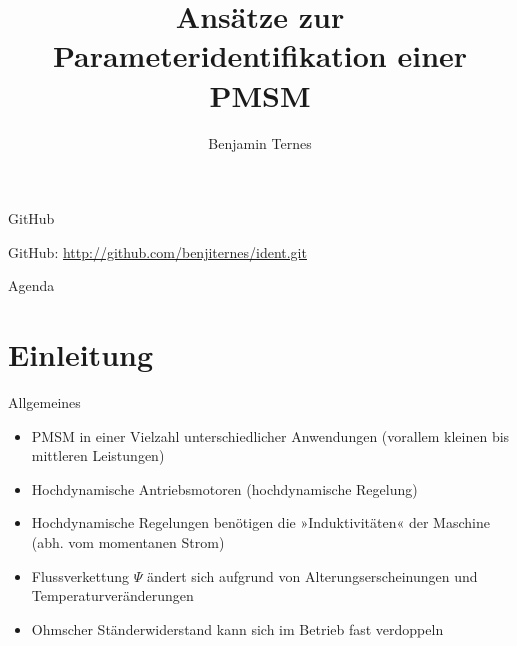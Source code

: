 \documentclass{beamer}
\title[Parameteridentifikation]{Ansätze zur Parameteridentifikation einer PMSM}
\author[Benjamin Ternes]%
{%
Benjamin Ternes
}
\institute{%
Hochschule Bochum\\
Fachbereich Elektrotechnik und Informatik}
\begin{document}
\begin{frame}[plain]
	\titlepage
\end{frame}

\begin{frame}{GitHub}

GitHub: \url{http://github.com/benjiternes/ident.git}

\end{frame}

\begin{frame}[plain]{Agenda}
	\tableofcontents
\end{frame}

\section{Einleitung}
\begin{frame}{Allgemeines}
\begin{itemize}
\item PMSM in einer Vielzahl unterschiedlicher Anwendungen (vorallem kleinen bis mittleren Leistungen)
\item Hochdynamische Antriebsmotoren (hochdynamische Regelung)
\item Hochdynamische Regelungen benötigen die »Induktivitäten« der Maschine (abh. vom momentanen Strom)
\item Flussverkettung $\Psi$ ändert sich aufgrund von Alterungserscheinungen und Temperaturveränderungen
\item Ohmscher Ständerwiderstand kann sich im Betrieb fast verdoppeln
\end{itemize}
\end{frame}
\end{document}

